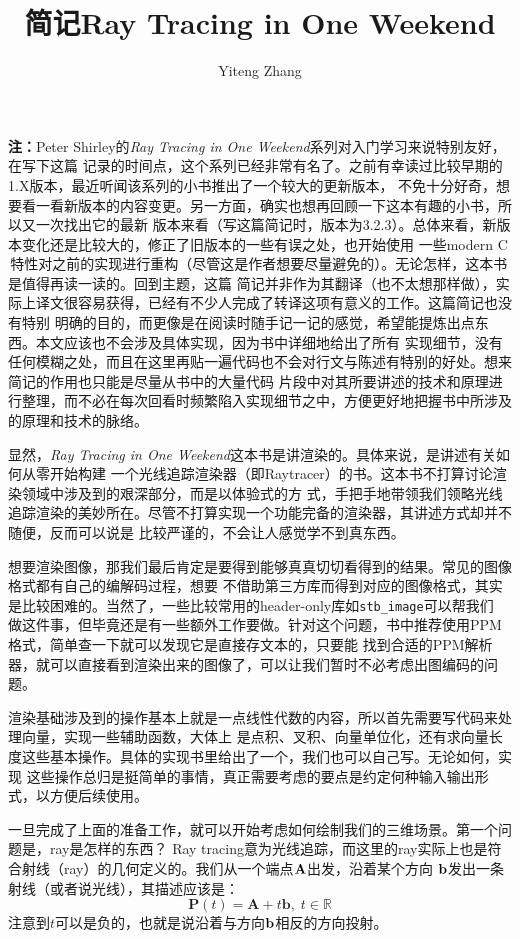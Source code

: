 \documentclass[12pt]{article}
\title{简记Ray Tracing in One Weekend}
\author{Yiteng Zhang}
\newcommand{\CC}{C\nolinebreak\hspace{-.05em}\raisebox{.4ex}{\tiny\bf +}%
\nolinebreak\hspace{-.10em}\raisebox{.4ex}{\tiny\bf +}}
\begin{document}
\maketitle

\noindent{}\textbf{注：}Peter Shirley的\textit{Ray Tracing in One Weekend}系列对入门学习来说特别友好，在写下这篇
记录的时间点，这个系列已经非常有名了。之前有幸读过比较早期的1.X版本，最近听闻该系列的小书推出了一个较大的更新版本，
不免十分好奇，想要看一看新版本的内容变更。另一方面，确实也想再回顾一下这本有趣的小书，所以又一次找出它的最新
版本来看（写这篇简记时，版本为3.2.3）。总体来看，新版本变化还是比较大的，修正了旧版本的一些有误之处，也开始使用
一些modern {\CC}\,特性对之前的实现进行重构（尽管这是作者想要尽量避免的）。无论怎样，这本书是值得再读一读的。回到主题，这篇
简记并非作为其翻译（也不太想那样做），实际上译文很容易获得，已经有不少人完成了转译这项有意义的工作。这篇简记也没有特别
明确的目的，而更像是在阅读时随手记一记的感觉，希望能提炼出点东西。本文应该也不会涉及具体实现，因为书中详细地给出了所有
实现细节，没有任何模糊之处，而且在这里再贴一遍代码也不会对行文与陈述有特别的好处。想来简记的作用也只能是尽量从书中的大量代码
片段中对其所要讲述的技术和原理进行整理，而不必在每次回看时频繁陷入实现细节之中，方便更好地把握书中所涉及的原理和技术的脉络。

\indent{}显然，\textit{Ray Tracing in One Weekend}这本书是讲渲染的。具体来说，是讲述有关如何从零开始构建
一个光线追踪渲染器（即Raytracer）的书。这本书不打算讨论渲染领域中涉及到的艰深部分，而是以体验式的方
式，手把手地带领我们领略光线追踪渲染的美妙所在。尽管不打算实现一个功能完备的渲染器，其讲述方式却并不随便，反而可以说是
比较严谨的，不会让人感觉学不到真东西。

\indent{}想要渲染图像，那我们最后肯定是要得到能够真真切切看得到的结果。常见的图像格式都有自己的编解码过程，想要
不借助第三方库而得到对应的图像格式，其实是比较困难的。当然了，一些比较常用的header-only库如\texttt{stb\_image}可以帮我们
做这件事，但毕竟还是有一些额外工作要做。针对这个问题，书中推荐使用PPM格式，简单查一下就可以发现它是直接存文本的，只要能
找到合适的PPM解析器，就可以直接看到渲染出来的图像了，可以让我们暂时不必考虑出图编码的问题。

\indent{}渲染基础涉及到的操作基本上就是一点线性代数的内容，所以首先需要写代码来处理向量，实现一些辅助函数，大体上
是点积、叉积、向量单位化，还有求向量长度这些基本操作。具体的实现书里给出了一个，我们也可以自己写。无论如何，实现
这些操作总归是挺简单的事情，真正需要考虑的要点是约定何种输入输出形式，以方便后续使用。

\indent{}一旦完成了上面的准备工作，就可以开始考虑如何绘制我们的三维场景。第一个问题是，ray是怎样的东西？
Ray tracing意为光线追踪，而这里的ray实际上也是符合射线（ray）的几何定义的。我们从一个端点$\bf{A}$出发，沿着某个方向
$\bf{b}$发出一条射线（或者说光线），其描述应该是：
\begin{equation}
\mathbf{P}(t) = \mathbf{A} + t\mathbf{b},\; t\in\mathbb{R}
\end{equation}
\noindent{}注意到$t$可以是负的，也就是说沿着与方向$\bf{b}$相反的方向投射。
\end{document}
